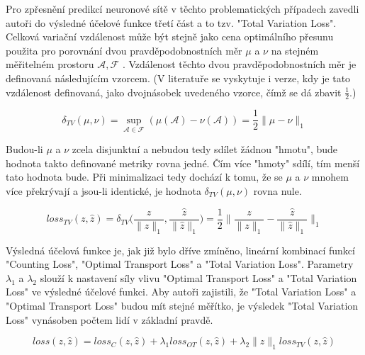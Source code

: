 Pro zpřesnění predikcí neuronové sítě v těchto problematických případech zavedli autoři do výsledné účelové funkce třetí část a to tzv. "Total Variation Loss".
Celková variační vzdálenost může být stejně jako cena optimálního přesunu použita pro porovnání dvou pravděpodobnostních měr \(\mu\) a \(\nu\) na stejném měřitelném prostoru \(\mathcal{A}, \mathcal{F}\) \cite{Total_variation}.
Vzdálenost těchto dvou pravděpodobnostních měr je definovaná následujícím vzorcem. (V literatuře se vyskytuje i verze, kdy je tato vzdálenost definovaná, jako dvojnásobek uvedeného vzorce, čímž se dá zbavit \(\frac{1}{2}\).)

\begin{equation}
\delta_{TV}(\mu, \nu) = \sup_{\mathcal{A} \in \mathcal{F}} (\mu(\mathcal{A}) - \nu(\mathcal{A})) = \frac{1}{2}\|\mu - \nu\|_1
\label{eq:total_variation}
\end{equation}

Budou-li \(\mu\) a \(\nu\) zcela disjunktní a nebudou tedy sdílet žádnou "hmotu", bude hodnota takto definované metriky rovna jedné.
Čím více "hmoty" sdílí, tím menší tato hodnota bude.
Při minimalizaci tedy dochází k tomu, že se \(\mu\) a \(\nu\) mnohem více překrývají a jsou-li identické, je hodnota \(\delta_{TV}(\mu, \nu)\) rovna nule.

\begin{equation}
loss_{TV}(z, \hat{z}) = \delta_{TV} \bigg( \frac{z}{\|z\|_1}, \frac{\hat{z}}{\|\hat{z}\|_1} \bigg)
= \frac{1}{2} \bigg\| \frac{z}{\|z\|_1} - \frac{\hat{z}}{\|\hat{z}\|_1} \bigg\|_1
\label{eq:tv_loss}
\end{equation}


Výsledná účelová funkce je, jak již bylo dříve zmíněno, lineární kombinací funkcí "Counting Loss",  "Optimal Transport Loss" a "Total Variation Loss". Parametry \(\lambda_1\) a \(\lambda_2\) slouží k nastavení síly vlivu "Optimal Transport Loss" a "Total Variation Loss" ve výsledné účelové funkci.
Aby autoři zajistili, že "Total Variation Loss" a "Optimal Transport Loss" budou mít stejné měřítko, je výsledek "Total Variation Loss" vynásoben počtem lidí v základní pravdě.

\begin{equation}
loss(z, \hat{z}) = loss_{C}(z, \hat{z}) + \lambda_1 loss_{OT}(z, \hat{z}) + \lambda_2 \|z\|_1 loss_{TV}(z, \hat{z})
\label{eq:overall_loss}
\end{equation}



\endinput